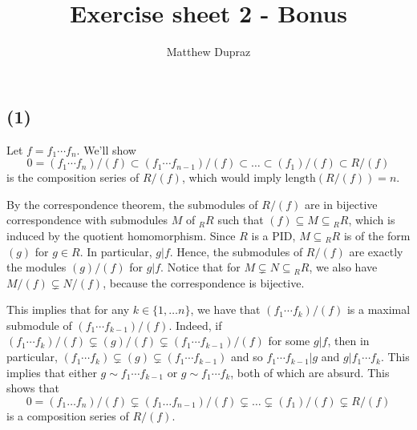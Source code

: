 \documentclass{article}
\author{Matthew Dupraz}
\title{Exercise sheet 2 - Bonus}
\begin{document}
\maketitle

\subsection*{(1)}

Let $f = f_1\cdots f_n$.
We'll show
$$0 = (f_1\cdots f_n)/(f) \subset
(f_1\cdots f_{n-1})/(f) \subset \dots \subset
(f_1)/(f) \subset R/(f)$$
is the composition series of $R/(f)$, 
which would imply $\mathrm{length}(R/(f)) = n$.

By the correspondence theorem, the submodules of $R/(f)$ are
in bijective correspondence with submodules $M$ of ${_RR}$ such that
$(f) \subseteq M \subseteq {_RR}$, which is induced by the quotient
homomorphism. Since $R$ is a PID, $M \subseteq {_RR}$ is of
the form $(g)$ for $g \in R$. In particular, $g | f$.
Hence, the submodules of $R/(f)$ are exactly the modules
$(g)/(f)$ for $g|f$. Notice that for
$M \subsetneq N \subseteq {_RR}$, we also
have $M/(f) \subsetneq N/(f)$, because the correspondence is
bijective.

This implies that for any $k \in \{1, \dots n\}$, we have that
$(f_1 \cdots f_k)/(f)$ is a maximal submodule of
$(f_1 \cdots f_{k-1})/(f)$.
Indeed, if $(f_1\cdots f_k)/(f) \subsetneq (g)/(f)
\subsetneq (f_1 \cdots f_{k-1})/(f)$ for some $g|f$, then in
particular, $(f_1\cdots f_k) \subsetneq (g)
\subsetneq (f_1 \cdots f_{k-1})$
and so $f_1 \cdots f_{k-1} | g$ and $g | f_1\cdots f_k$.
This implies
that either $g \sim f_1 \cdots f_{k-1}$ or
$g \sim f_1 \cdots f_k$,
both of which are absurd.
This shows that
$$0 = (f_1\dots f_n)/(f) \subsetneq
(f_1\dots f_{n-1})/(f) \subsetneq \dots \subsetneq
(f_1)/(f) \subsetneq R/(f)$$
is a composition series of $R/(f)$.

\end{document}
